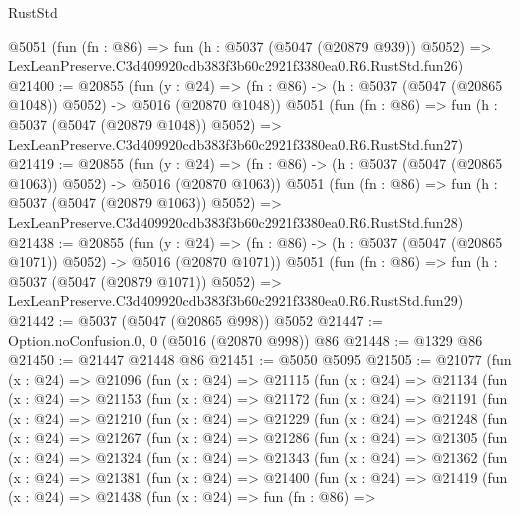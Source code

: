 \begin{lexlean}{RustStd}
\begin{coremodule}
    @5051
    (fun (fn : @86) =>
    fun (h : @5037 (@5047 (@20879 @939)) @5052) =>
    LexLeanPreserve.C3d409920cdb383f3b60c2921f3380ea0.R6.RustStd.fun26)
@21400 := @20855
    (fun (y : @24) =>
    (fn : @86) -> (h : @5037 (@5047 (@20865 @1048)) @5052) -> @5016 (@20870 @1048))
    @5051
    (fun (fn : @86) =>
    fun (h : @5037 (@5047 (@20879 @1048)) @5052) =>
    LexLeanPreserve.C3d409920cdb383f3b60c2921f3380ea0.R6.RustStd.fun27)
@21419 := @20855
    (fun (y : @24) =>
    (fn : @86) -> (h : @5037 (@5047 (@20865 @1063)) @5052) -> @5016 (@20870 @1063))
    @5051
    (fun (fn : @86) =>
    fun (h : @5037 (@5047 (@20879 @1063)) @5052) =>
    LexLeanPreserve.C3d409920cdb383f3b60c2921f3380ea0.R6.RustStd.fun28)
@21438 := @20855
    (fun (y : @24) =>
    (fn : @86) -> (h : @5037 (@5047 (@20865 @1071)) @5052) -> @5016 (@20870 @1071))
    @5051
    (fun (fn : @86) =>
    fun (h : @5037 (@5047 (@20879 @1071)) @5052) =>
    LexLeanPreserve.C3d409920cdb383f3b60c2921f3380ea0.R6.RustStd.fun29)
@21442 := @5037 (@5047 (@20865 @998)) @5052
@21447 := Option.noConfusion.{0, 0} (@5016 (@20870 @998)) @86
@21448 := @1329 @86
@21450 := @21447 @21448 @86
@21451 := @5050 @5095
@21505 := @21077
    (fun (x : @24) =>
    @21096
      (fun (x : @24) =>
      @21115
        (fun (x : @24) =>
        @21134
          (fun (x : @24) =>
          @21153
            (fun (x : @24) =>
            @21172
              (fun (x : @24) =>
              @21191
                (fun (x : @24) =>
                @21210
                  (fun (x : @24) =>
                  @21229
                    (fun (x : @24) =>
                    @21248
                      (fun (x : @24) =>
                      @21267
                        (fun (x : @24) =>
                        @21286
                          (fun (x : @24) =>
                          @21305
                            (fun (x : @24) =>
                            @21324
                              (fun (x : @24) =>
                              @21343
                                (fun (x : @24) =>
                                @21362
                                  (fun (x : @24) =>
                                  @21381
                                    (fun (x : @24) =>
                                    @21400
                                      (fun (x : @24) =>
                                      @21419
                                        (fun (x : @24) =>
                                        @21438
                                          (fun (x : @24) =>
                                          fun (fn : @86) =>

\end{coremodule}
\end{lexlean}
